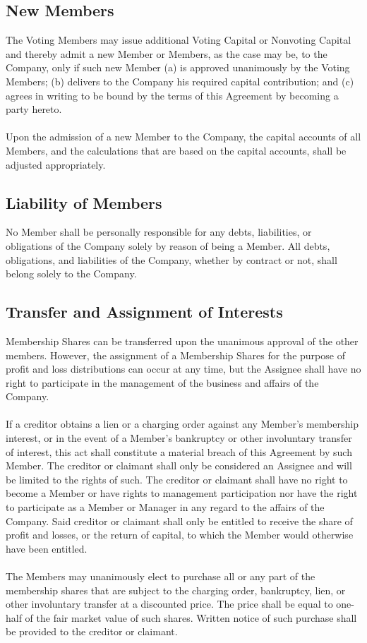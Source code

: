 \documentclass[11pt]{article}
\begin{document}
\subsection{New Members}
The Voting Members may issue additional Voting Capital or Nonvoting Capital and thereby admit a new Member or Members, as the case may be, to the Company, only if such new Member (a) is approved unanimously by the Voting Members; (b) delivers to the Company his required capital contribution; and (c) agrees in writing to be bound by the terms of this Agreement by becoming a party hereto.\\\\
Upon the admission of a new Member to the Company, the capital accounts of all Members, and the calculations that are based on the capital accounts, shall be adjusted appropriately.

\subsection{Liability of Members}
No Member shall be personally responsible for any debts, liabilities, or obligations of the Company solely by reason of being a Member. All debts, obligations, and liabilities of the Company, whether by contract or not, shall belong solely to the Company.

\subsection{Transfer and Assignment of Interests}
Membership Shares can be transferred upon the unanimous approval of the other members. However, the assignment of a Membership Shares for the purpose of profit and loss distributions can occur at any time, but the Assignee shall have no right to participate in the management of the business and affairs of the Company.\\\\
If a creditor obtains a lien or a charging order against any Member's membership interest, or in the event of a Member's bankruptcy or other involuntary transfer of interest, this act shall constitute a material breach of this Agreement by such Member. The creditor or claimant shall only be considered an Assignee and will be limited to the rights of such. The creditor or claimant shall have no right to become a Member or have rights to management participation nor have the right to participate as a Member or Manager in any regard to the affairs of the Company. Said creditor or claimant shall only be entitled to receive the share of profit and losses, or the return of capital, to which the Member would otherwise have been entitled.\\\\
The Members may unanimously elect to purchase all or any part of the membership shares that are subject to the charging order, bankruptcy, lien, or other involuntary transfer at a discounted price. The price shall be equal to one-half of the fair market value of such shares. Written notice of such purchase shall be provided to the creditor or claimant.
\end{document}
